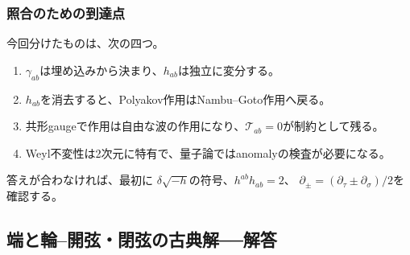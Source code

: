 \documentclass[paper=b5j,fontsize=11Q,jafontsize=11Q,baselineskip=19Q]{jlreq}
\newcommand{\runningtitle}{章題未定}
\numberwithin{equation}{section}
\begin{document}
\subsubsection*{照合のための到達点}

今回分けたものは、次の四つ。
\begin{enumerate}
  \item $\gamma_{ab}$は埋め込みから決まり、$h_{ab}$は独立に変分する。
  \item $h_{ab}$を消去すると、Polyakov作用はNambu--Goto作用へ戻る。
  \item 共形gaugeで作用は自由な波の作用になり、$\mathcal T_{ab}=0$が制約として残る。
  \item Weyl不変性は2次元に特有で、量子論ではanomalyの検査が必要になる。
\end{enumerate}
答えが合わなければ、最初に
$\delta\sqrt{-h}$の符号、$h^{ab}h_{ab}=2$、
$\partial_\pm=(\partial_\tau\pm\partial_\sigma)/2$を確認する。


\par\bigskip
\endgroup
\begingroup
\renewcommand{\runningtitle}{解答 第5章　弦の古典論}
\subsection[端と輪]{端と輪--開弦・閉弦の古典解──解答}
\end{document}
